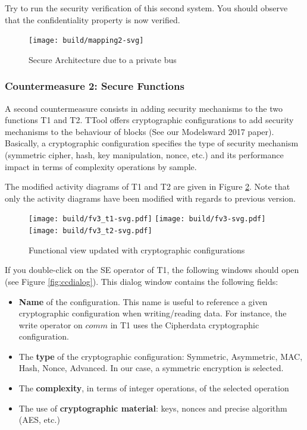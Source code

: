 \documentclass[12pt]{article}
\begin{document}
Try to run the security verification of this second system. You should observe that the confidentiality property is now verified.

\begin{figure}[htbp]
\centering
\texttt{[image: build/mapping2-svg]}
\caption{Secure Architecture due to a private bus} \label{fig:mapping2}
\end{figure}

\subsubsection{Countermeasure 2: Secure Functions}
A second countermeasure consists in adding security mechanisms to the two functions T1 and T2. TTool offers cryptographic configurations to add security mechanisms to the behaviour of blocks (See our Modelsward 2017 paper). Basically, a cryptographic configuration specifies the type of security mechanism (symmetric cipher, hash, key manipulation, nonce, etc.) and its performance impact in terms of complexity operations by sample.

The modified activity diagrams of T1 and T2 are given in Figure \ref{fig:fv3}. Note that only the activity diagrams have been modified with regards to previous version.

\begin{figure}[htbp]
\centering
\texttt{[image: build/fv3\_t1-svg.pdf]}
\texttt{[image: build/fv3-svg.pdf]}
\texttt{[image: build/fv3\_t2-svg.pdf]}
\caption{Functional view updated with cryptographic configurations} \label{fig:fv3}
\end{figure}

If you double-click on the SE operator of T1, the following windows should open (see Figure \ref{fig:ccdialog}). This dialog window contains the following fields:
\begin{itemize}
\item \textbf{Name} of the configuration. This name is useful to reference a given cryptographic configuration when writing/reading data. For instance, the write operator on $comm$ in T1 uses the Cipherdata cryptographic configuration.
\item The \textbf{type} of the cryptographic configuration: Symmetric, Asymmetric, MAC, Hash, Nonce, Advanced. In our case, a symmetric encryption is selected.
\item The \textbf{complexity}, in terms of integer operations, of the selected operation
\item The use of \textbf{cryptographic material}: keys, nonces and precise algorithm (AES, etc.) 
\end{itemize}
\end{document}
